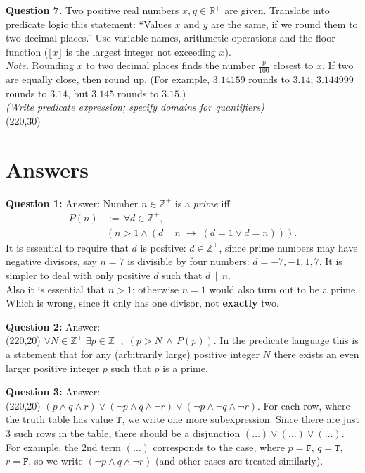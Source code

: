 \documentclass[jou]{apa6}
\begin{document}
{\bf Question 7.} 
Two positive real numbers $x,y \in \mathbb{R}^{+}$ are given. 
Translate into predicate logic this statement:
``Values $x$ and $y$ are the same, if we round them to two 
decimal places.'' Use variable names, arithmetic operations and 
the floor function ($\lfloor x \rfloor$ is the largest integer not
exceeding $x$).\\
{\em Note.} Rounding $x$ to two decimal places finds the 
number $\frac{p}{100}$ closest to $x$. 
If two are equally close, then round up.
(For example, $3.14159$ rounds to $3.14$; $3.144999$ rounds to $3.14$, 
but $3.145$ rounds to $3.15$.)\\
{\scriptsize \em (Write predicate expression; specify domains for quantifiers)}\\
\framebox(220,30){}

\newpage

\section{Answers}

{\bf Question 1:} Answer: Number $n \in \mathbb{Z}^{+}$ is a {\em prime} iff
\begin{align}
P(n) & :=\, \forall d \in \mathbb{Z}^{+}, \nonumber \\
 & \left( n > 1 \wedge \left( d \,\mid\, n \;\rightarrow\; (d = 1 \vee d = n) \right)\right). \nonumber
\end{align}
It is essential to require that $d$ is positive: $d \in \mathbb{Z}^{+}$, since prime numbers
may have negative divisors, say $n=7$ is divisible by four numbers: $d=-7, -1, 1, 7$. It is 
simpler to deal with only positive $d$ such that $d\,\mid\,n$.\\
Also it is essential that $n>1$; otherwise $n=1$ would also turn out to be a prime. Which is wrong, since it 
only has one divisor, not {\bf exactly} two.

\vspace{10pt}
{\bf Question 2:} Answer:\\[5pt]
\framebox(220,20){
$\forall N \in \mathbb{Z}^{+}\; \exists p \in \mathbb{Z}^{+},\;\left( p > N \,\wedge\, P(p) \right).$
}
In the predicate language this is a statement that for any (arbitrarily large) positive integer $N$ 
there exists an even larger positive integer $p$ such that $p$ is a prime. 

\vspace{10pt}
{\bf Question 3:} Answer:\\[5pt]
\framebox(220,20){
$(p \wedge q \wedge r) \vee (\neg p \wedge q \wedge \neg r) \vee (\neg p \wedge \neg q \wedge \neg r).$
}
For each row, where the truth table has value ${\tt T}$, we write one more
subexpression. Since there are just $3$ such rows in the table, 
there should be a disjunction $(\ldots) \vee (\ldots) \vee (\ldots)$. 
For example, the 2nd term $(\ldots)$ corresponds to the case, where $p = \mathtt{F}$, 
$q = \mathtt{T}$, $r = \mathtt{F}$, so we write $(\neg p \wedge q \wedge \neg r)$ (and other cases
are treated similarly).
\end{document}
